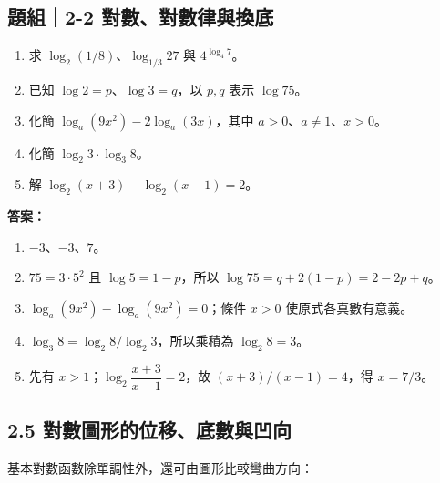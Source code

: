 \documentclass[11pt,a4paper]{article}
\providecommand{\tightlist}{%
  \setlength{\itemsep}{0pt}\setlength{\parskip}{0pt}}
\begin{document}
\begin{HandoutSelfCheck}

\subsection{題組｜2-2 對數、對數律與換底}\label{ux984cux7d442-2-ux5c0dux6578ux5c0dux6578ux5f8bux8207ux63dbux5e95}

\begin{enumerate}
\def\labelenumi{\arabic{enumi}.}
\tightlist
\item
  求 \(\log_2(1/8)\)、\(\log_{1/3}27\) 與 \(4^{\log_4 7}\)。
\item
  已知 \(\log2=p\)、\(\log3=q\)，以 \(p,q\) 表示 \(\log75\)。
\item
  化簡 \(\log_a(9x^2)-2\log_a(3x)\)，其中 \(a>0\)、\(a\ne1\)、\(x>0\)。
\item
  化簡 \(\log_2 3\cdot\log_3 8\)。
\item
  解 \(\log_2(x+3)-\log_2(x-1)=2\)。
\end{enumerate}

\textbf{答案：}

\begin{enumerate}
\def\labelenumi{\arabic{enumi}.}
\tightlist
\item
  \(-3\)、\(-3\)、\(7\)。
\item
  \(75=3\cdot5^2\) 且 \(\log5=1-p\)，所以 \(\log75=q+2(1-p)=2-2p+q\)。
\item
  \(\log_a(9x^2)-\log_a(9x^2)=0\)；條件 \(x>0\) 使原式各真數有意義。
\item
  \(\log_3 8=\log_2 8/\log_2 3\)，所以乘積為 \(\log_2 8=3\)。
\item
  先有 \(x>1\)；\(\log_2\dfrac{x+3}{x-1}=2\)，故 \((x+3)/(x-1)=4\)，得 \(x=7/3\)。
\end{enumerate}

\end{HandoutSelfCheck}

\subsection{2.5 對數圖形的位移、底數與凹向}\label{ux5c0dux6578ux5716ux5f62ux7684ux4f4dux79fbux5e95ux6578ux8207ux51f9ux5411}

基本對數函數除單調性外，還可由圖形比較彎曲方向：
\end{document}
